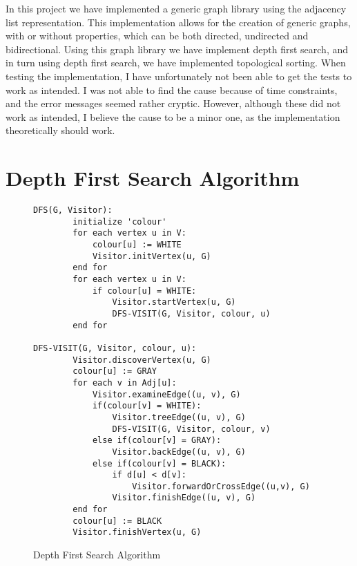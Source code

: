\documentclass{article}
\begin{document}
In this project we have implemented a generic graph library using the adjacency list representation.
This implementation allows for the creation of generic graphs, with or without properties, which can be both 
directed, undirected and bidirectional.
Using this graph library we have implement depth first search, and in turn using depth first search, we have implemented topological sorting.
When testing the implementation, I have unfortunately not been able to get the tests to work as intended. I was not able to find the cause because of time constraints, and the error messages seemed rather cryptic. 
However, although these did not work as intended, I believe the cause to be a minor one, as the implementation theoretically should work. 



\newpage
\appendix

\section{Depth First Search Algorithm}
\begin{figure}[h]
    \begin{lstlisting}
DFS(G, Visitor):
        initialize 'colour'
        for each vertex u in V:
            colour[u] := WHITE
            Visitor.initVertex(u, G)
        end for
        for each vertex u in V:
            if colour[u] = WHITE:
                Visitor.startVertex(u, G)
                DFS-VISIT(G, Visitor, colour, u)
        end for

DFS-VISIT(G, Visitor, colour, u):
        Visitor.discoverVertex(u, G)
        colour[u] := GRAY
        for each v in Adj[u]:
            Visitor.examineEdge((u, v), G)
            if(colour[v] = WHITE):
                Visitor.treeEdge((u, v), G)
                DFS-VISIT(G, Visitor, colour, v)
            else if(colour[v] = GRAY):
                Visitor.backEdge((u, v), G)
            else if(colour[v] = BLACK):
                if d[u] < d[v]:
                    Visitor.forwardOrCrossEdge((u,v), G)
                Visitor.finishEdge((u, v), G)
        end for
        colour[u] := BLACK
        Visitor.finishVertex(u, G)
    \end{lstlisting}
    \label{dfs}
    \caption{Depth First Search Algorithm}
\end{figure}
\end{document}
